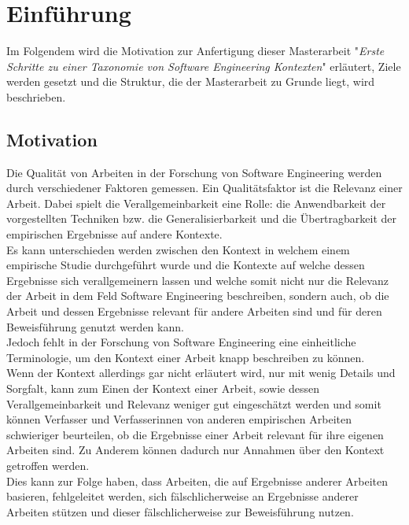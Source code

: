 \chapter{Einführung}
\label{chapter:intro}
Im Folgendem wird die Motivation zur Anfertigung dieser Masterarbeit "\textit{Erste Schritte zu einer Taxonomie von Software Engineering Kontexten}" erläutert, Ziele werden gesetzt und die Struktur, die der Masterarbeit zu Grunde liegt, wird beschrieben.

\section{Motivation}
Die Qualität von Arbeiten in der Forschung von Software Engineering werden durch verschiedener Faktoren gemessen. Ein Qualitätsfaktor ist die Relevanz einer Arbeit.
Dabei spielt die Verallgemeinbarkeit eine Rolle: die Anwendbarkeit der vorgestellten Techniken bzw. die Generalisierbarkeit und die Übertragbarkeit der empirischen Ergebnisse auf andere Kontexte. \\

Es kann unterschieden werden zwischen den Kontext in welchem einem empirische Studie durchgeführt wurde und die Kontexte auf welche dessen Ergebnisse sich verallgemeinern lassen und welche somit nicht nur die Relevanz der Arbeit in dem Feld Software Engineering beschreiben, sondern auch, ob die Arbeit und dessen Ergebnisse relevant für andere Arbeiten sind und für deren Beweisführung genutzt werden kann. \\

Jedoch fehlt in der Forschung von Software Engineering eine einheitliche Terminologie, um den Kontext einer Arbeit knapp beschreiben zu können. \\
Wenn der Kontext allerdings gar nicht erläutert wird, nur mit wenig Details und Sorgfalt, kann zum Einen der Kontext einer Arbeit, sowie dessen Verallgemeinbarkeit und Relevanz weniger gut eingeschätzt werden und somit können Verfasser und Verfasserinnen von anderen empirischen Arbeiten schwieriger beurteilen, ob die Ergebnisse einer Arbeit relevant für ihre eigenen Arbeiten sind. Zu Anderem können dadurch nur Annahmen über den Kontext getroffen werden. \\
Dies kann zur Folge haben, dass Arbeiten, die auf Ergebnisse anderer Arbeiten basieren, fehlgeleitet werden, sich fälschlicherweise an Ergebnisse anderer Arbeiten stützen und dieser fälschlicherweise zur Beweisführung nutzen. \\ 

